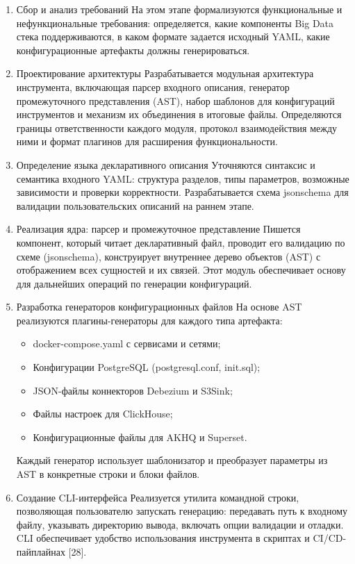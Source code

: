 \begin{enumerate}[label=\textbf{Этап \arabic*.}]
    \item Сбор и анализ требований
          На этом этапе формализуются функциональные и нефункциональные требования: определяется, какие компоненты Big Data стека поддерживаются, в каком формате задается исходный YAML, какие конфигурационные артефакты должны генерироваться.
    \item  Проектирование архитектуры
          Разрабатывается модульная архитектура инструмента, включающая парсер входного описания, генератор промежуточного представления (AST), набор шаблонов для конфигураций инструментов и механизм их объединения в итоговые файлы. Определяются границы ответственности каждого модуля, протокол взаимодействия между ними и формат плагинов для расширения функциональности.
    \item  Определение языка декларативного описания
          Уточняются синтаксис и семантика входного YAML: структура разделов, типы параметров, возможные зависимости и проверки корректности. Разрабатывается схема jsonschema для валидации пользовательских описаний на раннем этапе.
    \item  Реализация ядра: парсер и промежуточное представление
          Пишется компонент, который читает декларативный файл, проводит его валидацию по схеме (jsonschema), конструирует внутреннее дерево объектов (AST) с отображением всех сущностей и их связей. Этот модуль обеспечивает основу для дальнейших операций по генерации конфигураций.
    \item Разработка генераторов конфигурационных файлов
          На основе AST реализуются плагины-генераторы для каждого типа артефакта:
          \begin{itemize}
              \item docker-compose.yaml с сервисами и сетями;
              \item Конфигурации PostgreSQL (postgresql.conf, init.sql);
              \item JSON-файлы коннекторов Debezium и S3Sink;
              \item Файлы настроек для ClickHouse;
              \item Конфигурационные файлы для AKHQ и Superset.
          \end{itemize}
          Каждый генератор использует шаблонизатор и преобразует параметры из AST в конкретные строки и блоки файлов.
    \item Создание CLI-интерфейса
          Реализуется утилита командной строки, позволяющая пользователю запускать генерацию: передавать путь к входному файлу,  указывать директорию вывода, включать опции валидации и отладки. CLI обеспечивает удобство использования инструмента в скриптах и CI/CD-пайплайнах [28].

\end{enumerate}
